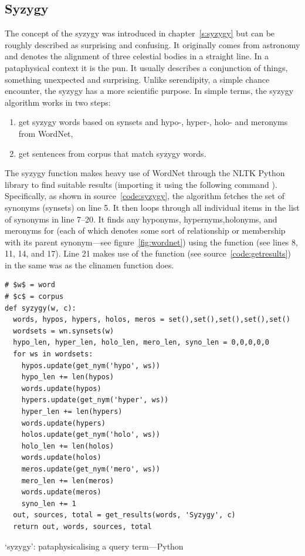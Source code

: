 \subsection{Syzygy}
\label{s:syzygyalgo}

The concept of the syzygy was introduced in chapter~\ref{s:syzygy} but can be roughly described as surprising and confusing. It originally comes from astronomy and denotes the alignment of three celestial bodies in a straight line. In a pataphysical context it is the pun. It usually describes a conjunction of things, something unexpected and surprising. Unlike serendipity, a simple chance encounter, the syzygy has a more scientific purpose. In simple terms, the syzygy algorithm works in two steps:

\begin{enumerate}
  \item get syzygy words based on synsets and hypo-, hyper-, holo- and meronyms from WordNet,
  \item get sentences from corpus that match syzygy words.
\end{enumerate}

The syzygy function makes heavy use of WordNet \autocite{Miller1995} through the \ac{NLTK} Python library \autocite{NLTK2016} to find suitable results (importing it using the following command ). Specifically, as shown in source~\ref{code:syzygy}, the algorithm fetches the set of synonyms (synsets) on line 5. It then loops through all individual items  in the list of synonyms  in line 7--20. It finds any hyponyms, hypernyms,holonyms, and meronyms for  (each of which denotes some sort of relationship or membership with its parent synonym---see figure~\ref{fig:wordnet}) using the  function (see lines 8, 11, 14, and 17). Line 21 makes use of the  function (see source~\ref{code:getresults}) in the same was as the clinamen function does.

\begin{listing}[!htbp] %
  \begin{verbatim}
# $w$ = word
# $c$ = corpus
def syzygy(w, c):
  words, hypos, hypers, holos, meros = set(),set(),set(),set(),set()
  wordsets = wn.synsets(w)
  hypo_len, hyper_len, holo_len, mero_len, syno_len = 0,0,0,0,0
  for ws in wordsets:
    hypos.update(get_nym('hypo', ws))
    hypo_len += len(hypos)
    words.update(hypos)
    hypers.update(get_nym('hyper', ws))
    hyper_len += len(hypers)
    words.update(hypers)
    holos.update(get_nym('holo', ws))
    holo_len += len(holos)
    words.update(holos)
    meros.update(get_nym('mero', ws))
    mero_len += len(meros)
    words.update(meros)
    syno_len += 1
  out, sources, total = get_results(words, 'Syzygy', c)
  return out, words, sources, total
  \end{verbatim}
\caption[`syzygy' function---Python]{`syzygy': pataphysicalising a query term---Python}
\label{code:syzygy}
\end{listing}

